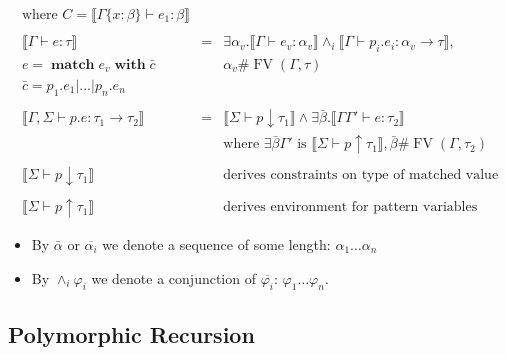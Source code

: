 \documentclass{beamer}
\newcommand{\tmmathbf}[1]{\ensuremath{\boldsymbol{#1}}}
\newcommand{\tmop}[1]{\ensuremath{\operatorname{#1}}}
\begin{document}
\begin{eqnarray*}
  \text{where } C = \llbracket \Gamma \{x : \beta\} \vdash e_1 : \beta
  \rrbracket\\
  &  & \\
  \llbracket \Gamma \vdash e : \tau \rrbracket & = & \exists \alpha_v .
  \llbracket \Gamma \vdash e_v : \alpha_v \rrbracket \wedge_i \llbracket
  \Gamma \vdash p_i .e_i : \alpha_v \rightarrow \tau \rrbracket,\\
  e = \tmmathbf{\tmop{match}} e_v \tmmathbf{\tmop{with}} \bar{c} &  & \alpha_v
  \# \tmop{FV} (\Gamma, \tau)\\
  \bar{c} = p_1 .e_1 | \ldots |p_n .e_n &  & \\
  &  & \\
  \llbracket \Gamma, \Sigma \vdash p.e : \tau_1 \rightarrow \tau_2 \rrbracket
  & = & \llbracket \Sigma \vdash p \downarrow \tau_1 \rrbracket \wedge \exists
  \bar{\beta} . \llbracket \Gamma \Gamma' \vdash e : \tau_2 \rrbracket\\
  &  & \text{where } \exists \bar{\beta} \Gamma' \text{ is } \llbracket
  \Sigma \vdash p \uparrow \tau_1 \rrbracket, \bar{\beta} \# \tmop{FV}
  (\Gamma, \tau_2)\\
  &  & \\
  \llbracket \Sigma \vdash p \downarrow \tau_1 \rrbracket &  & \text{derives
  constraints on type of matched value}\\
  &  & \\
  \llbracket \Sigma \vdash p \uparrow \tau_1 \rrbracket &  & \text{derives
  environment for pattern variables}
\end{eqnarray*}
\begin{itemize}
  \item By $\bar{\alpha}$ or $\overline{\alpha_i}$ we denote a sequence of
  some length: $\alpha_1 \ldots \alpha_n$
  
  \item By $\wedge_i \varphi_i$ we denote a conjunction of
  $\overline{\varphi_i}$: $\varphi_1 \ldots \varphi_n$.
\end{itemize}

\subsection{Polymorphic Recursion}
\end{document}
